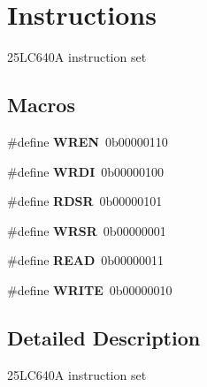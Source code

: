 \hypertarget{group___instructions}{}\section{Instructions}
\label{group___instructions}


25\+L\+C640A instruction set  


\subsection*{Macros}
\begin{DoxyCompactItemize}
\item 
\mbox{\label{group___instructions_ga53dec1d28a7c7b24b2d56c058f7e140a}} 
\#define {\bfseries W\+R\+EN}~0b00000110
\item 
\mbox{\label{group___instructions_gacb229428140f30a6f8b6fa2ebb3fb6f0}} 
\#define {\bfseries W\+R\+DI}~0b00000100
\item 
\mbox{\label{group___instructions_ga899f71cf1ab9be6e8c8482e443558450}} 
\#define {\bfseries R\+D\+SR}~0b00000101
\item 
\mbox{\label{group___instructions_ga29d01dca16eb0a060d2efd567b58b47a}} 
\#define {\bfseries W\+R\+SR}~0b00000001
\item 
\mbox{\label{group___instructions_gada74e7db007a68e763f20c17f2985356}} 
\#define {\bfseries R\+E\+AD}~0b00000011
\item 
\mbox{\label{group___instructions_gaa10f470e996d0f51210d24f442d25e1e}} 
\#define {\bfseries W\+R\+I\+TE}~0b00000010
\end{DoxyCompactItemize}


\subsection{Detailed Description}
25\+L\+C640A instruction set 

